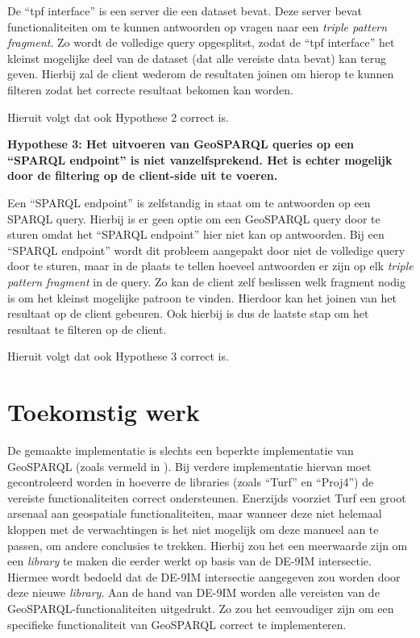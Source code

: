 De ``\acrshort{tpf} interface'' is een server die een dataset bevat. Deze server bevat functionaliteiten om te kunnen antwoorden op vragen naar een \textit{triple pattern fragment}. Zo wordt de volledige query opgesplitst, zodat de ``\acrshort{tpf} interface'' het kleinst mogelijke deel van de dataset (dat alle vereiste data bevat) kan terug geven. Hierbij zal de client wederom de resultaten joinen om hierop te kunnen filteren zodat het correcte resultaat bekomen kan worden.

Hieruit volgt dat ook Hypothese 2 correct is.

\textbf{Hypothese 3: Het uitvoeren van GeoSPARQL queries op een ``SPARQL endpoint'' is niet vanzelfsprekend. Het is echter mogelijk door de filtering op de client-side uit te voeren.}

Een ``SPARQL endpoint'' is zelfstandig in staat om te antwoorden op een SPARQL query. Hierbij is er geen optie om een GeoSPARQL query door te sturen omdat het ``SPARQL endpoint'' hier niet kan op antwoorden. Bij een ``SPARQL endpoint'' wordt dit probleem aangepakt door niet de volledige query door te sturen, maar in de plaats te tellen hoeveel antwoorden er zijn op elk \textit{triple pattern fragment} in de query. Zo kan de client zelf beslissen welk fragment nodig is om het kleinst mogelijke patroon te vinden. Hierdoor kan het joinen van het resultaat op de client gebeuren. Ook hierbij is dus de laatste stap om het resultaat te filteren op de client. 

Hieruit volgt dat ook Hypothese 3 correct is.

\section{Toekomstig werk}

De gemaakte implementatie is slechts een beperkte implementatie van GeoSPARQL (zoals vermeld in ). Bij verdere implementatie hiervan moet gecontroleerd worden in hoeverre de libraries (zoals ``Turf'' en ``Proj4'') de vereiste functionaliteiten correct ondersteunen. Enerzijds voorziet Turf een groot arsenaal aan geospatiale functionaliteiten, maar wanneer deze niet helemaal kloppen met de verwachtingen is het niet mogelijk om deze manueel aan te passen, om andere conclusies te trekken. Hierbij zou het een meerwaarde zijn om een \textit{library} te maken die eerder werkt op basis van de DE-9IM intersectie. Hiermee wordt bedoeld dat de DE-9IM intersectie aangegeven zou worden door deze nieuwe \textit{library}. Aan de hand van DE-9IM worden alle vereisten van de GeoSPARQL-functionaliteiten uitgedrukt. Zo zou het eenvoudiger zijn om een specifieke functionaliteit van GeoSPARQL correct te implementeren. 

